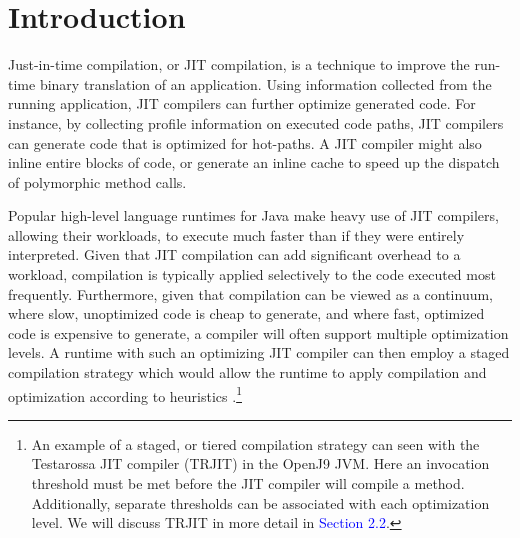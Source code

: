 \section{Introduction}
Just-in-time compilation, or JIT compilation, is a technique to improve the run-time binary translation of an application.
Using information collected from the running application, JIT compilers can further optimize generated code.
For instance, by collecting profile information on executed code paths, JIT compilers can generate code that is optimized for hot-paths.
A JIT compiler might also inline entire blocks of code, or generate an inline cache to speed up the dispatch of polymorphic method calls.

Popular high-level language runtimes for Java make heavy use of JIT compilers, allowing their workloads, to execute much faster than if they were entirely interpreted.
Given that JIT compilation can add significant overhead to a workload, compilation is typically applied selectively to the code executed most frequently.
Furthermore, given that compilation can be viewed as a continuum, where slow, unoptimized code is cheap to generate, and where fast, optimized code is expensive to generate, a compiler will often support multiple optimization levels.
A runtime with such an optimizing JIT compiler can then employ a staged compilation strategy which would allow the runtime to apply compilation and optimization according to heuristics .\footnote{
    An example of a staged, or tiered compilation strategy can seen with the Testarossa JIT compiler (TRJIT) in the OpenJ9 JVM.
    Here an invocation threshold must be met before the JIT compiler will compile a method.
    Additionally, separate thresholds can be associated with each optimization level.
    We will discuss TRJIT in more detail in \textcolor{blue}{Section 2.2}.
    }

